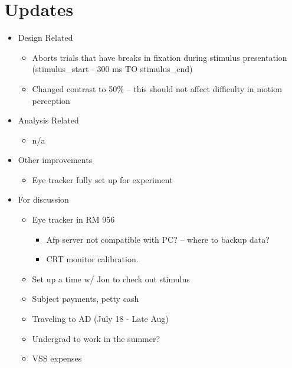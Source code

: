 \documentclass[11pt]{article} %
\begin{document}
\section{Updates} 
\begin{itemize}
\item Design Related
	\begin{itemize}
	\item Aborts trials that have breaks in fixation during stimulus presentation (stimulus\_start - 300 ms TO stimulus\_end)
	\item Changed contrast to 50\% -- this should not affect difficulty in motion perception
	\end{itemize}
\item Analysis Related
	\begin{itemize}
	\item n/a
	\end{itemize}
\item Other improvements
	\begin{itemize}
	\item Eye tracker fully set up for experiment
	\end{itemize}
\item For discussion
	\begin{itemize}
	\item Eye tracker in RM 956
		\begin{itemize}
			\item{Afp server not compatible with PC? -- where to backup data?}
			\item{CRT monitor calibration.}
		\end{itemize}
	\item Set up a time w/ Jon to check out stimulus
	\item Subject payments, petty cash
	\item Traveling to AD (July 18 - Late Aug)
	\item Undergrad to work in the summer?
	\item VSS expenses
	\end{itemize}
\end{itemize}
\end{document}
